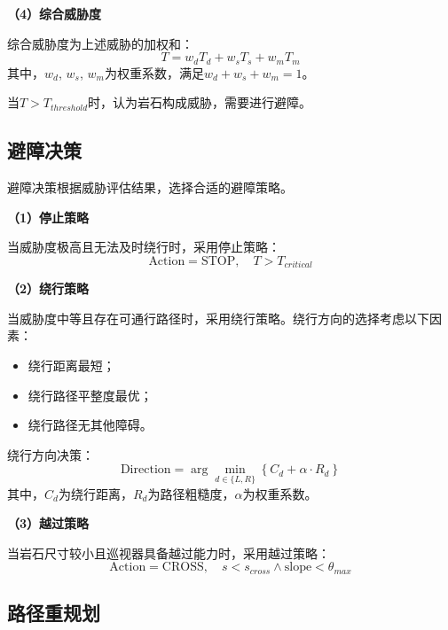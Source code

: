 \textbf{（4）综合威胁度}

综合威胁度为上述威胁的加权和：
\begin{equation}
    T = w_d T_d + w_s T_s + w_m T_m
    \label{eq:threat_total}
\end{equation}
其中，$w_d$, $w_s$, $w_m$为权重系数，满足$w_d + w_s + w_m = 1$。

当$T > T_{threshold}$时，认为岩石构成威胁，需要进行避障。

\subsection{避障决策}
\label{subsec:avoidance_decision}

避障决策根据威胁评估结果，选择合适的避障策略。

\textbf{（1）停止策略}

当威胁度极高且无法及时绕行时，采用停止策略：
\begin{equation}
    \text{Action} = \text{STOP}, \quad T > T_{critical}
    \label{eq:strategy_stop}
\end{equation}

\textbf{（2）绕行策略}

当威胁度中等且存在可通行路径时，采用绕行策略。绕行方向的选择考虑以下因素：
\begin{itemize}
    \item 绕行距离最短；
    \item 绕行路径平整度最优；
    \item 绕行路径无其他障碍。
\end{itemize}

绕行方向决策：
\begin{equation}
    \text{Direction} = \arg\min_{d \in \{L, R\}} \left\{C_d + \alpha \cdot R_d\right\}
    \label{eq:strategy_detour}
\end{equation}
其中，$C_d$为绕行距离，$R_d$为路径粗糙度，$\alpha$为权重系数。

\textbf{（3）越过策略}

当岩石尺寸较小且巡视器具备越过能力时，采用越过策略：
\begin{equation}
    \text{Action} = \text{CROSS}, \quad s < s_{cross} \land \text{slope} < \theta_{max}
    \label{eq:strategy_cross}
\end{equation}

\subsection{路径重规划}
\label{subsec:path_replanning}

